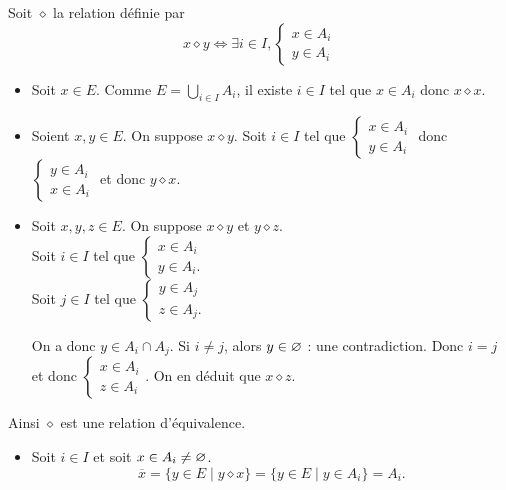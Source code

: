 \begin{prv}
	Soit $\diamond$ la relation définie par \[
		x \diamond y \iff \exists i \in I, \begin{cases}
			x \in A_i\\
			y \in A_i
		\end{cases}
	\]
	\begin{itemize}
		\item Soit $x \in E$. Comme $E = \bigcup_{i \in I} A_i$, il existe $i \in I$ tel que $x \in A_i$ donc $x \diamond x$.
		\item Soient $x,y \in E$. On suppose $x \diamond y$. Soit $i \in I$ tel que $\begin{cases}
				x \in A_i\\
				y \in A_i
			\end{cases}$ donc $\begin{cases}
				y \in A_i\\
				x \in A_i
			\end{cases}$ et donc $y \diamond x$.
		\item Soit $x,y,z \in E$. On suppose $x \diamond y$ et $y \diamond z$.\\
			Soit $i \in I$ tel que $\begin{cases}
				x \in A_i\\y\in A_i.
			\end{cases}$\\
			Soit $j \in I$ tel que $\begin{cases}
				y \in A_j\\
				z \in A_j.
			\end{cases}$

			On a donc $y \in A_i \cap A_j$. Si $i \neq j$, alors $y \in \varnothing$ : une contradiction. Donc $i = j$ et donc $\begin{cases}
				x \in A_i\\
				z \in A_i
			\end{cases}$. On en déduit que $x\diamond z$.
	\end{itemize}

	Ainsi $\diamond$ est une relation d'équivalence.
	\begin{itemize}
		\item Soit $i \in I$ et soit $x \in A_i \neq \varnothing$. \[
			\overline{x} = \{y \in E  \mid y \diamond x\} = \{y \in E \mid y\in A_i\} = A_i.
		\]
	\end{itemize}
\end{prv}

